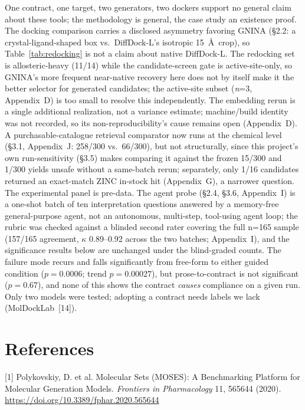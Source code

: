 \documentclass{article}
\begin{document}
One contract, one target, two generators, two dockers support no general claim about these tools; the methodology is general, the case study an existence proof. The docking comparison carries a disclosed asymmetry favoring GNINA (\S2.2: a crystal-ligand-shaped box vs.\ DiffDock-L's isotropic 15~\AA\ crop), so Table~\ref{tab:redocking} is not a claim about native DiffDock-L. The redocking set is allosteric-heavy (11/14) while the candidate-screen gate is active-site-only, so GNINA's more frequent near-native recovery here does not by itself make it the better selector for generated candidates; the active-site subset (\emph{n}=3, Appendix~D) is too small to resolve this independently. The embedding rerun is a single additional realization, not a variance estimate; machine/build identity was not recorded, so its non-reproducibility's cause remains open (Appendix~D). A purchasable-catalogue retrieval comparator now runs at the chemical level (\S3.1, Appendix~J: 258/300 vs.\ 66/300), but not structurally, since this project's own run-sensitivity (\S3.5) makes comparing it against the frozen 15/300 and 1/300 yields unsafe without a same-batch rerun; separately, only 1/16 candidates returned an exact-match ZINC in-stock hit (Appendix~G), a narrower question. The experimental panel is pre-data. The agent probe (\S2.4, \S3.6, Appendix~I) is a one-shot batch of ten interpretation questions answered by a memory-free general-purpose agent, not an autonomous, multi-step, tool-using agent loop; the rubric was checked against a blinded second rater covering the full n=165 sample (157/165 agreement, $\kappa$ 0.89--0.92 across the two batches; Appendix~I), and the significance results below are unchanged under the blind-graded counts. The failure mode recurs and falls significantly from free-form to either guided condition ($p=0.0006$; trend $p=0.00027$), but prose-to-contract is not significant ($p=0.67$), and none of this shows the contract \emph{causes} compliance on a given run. Only two models were tested; adopting a contract needs labels we lack (MolDockLab~[14]).

\section*{References}

\small

[1] Polykovskiy, D. et al. Molecular Sets (MOSES): A Benchmarking Platform for Molecular Generation Models. \textit{Frontiers in Pharmacology} 11, 565644 (2020). \url{https://doi.org/10.3389/fphar.2020.565644}
\end{document}
